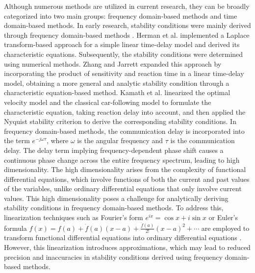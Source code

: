 \documentclass[journal]{IEEEtran}
\begin{document}
Although numerous methods are utilized in current research, they can be broadly categorized into two main groups: frequency domain-based methods and time domain-based methods. In early research, stability conditions were mainly derived through frequency domain-based methods \citep{qin2019experimental,zhang2017hierarchical}. Herman et al. \citep{herman1959traffic} implemented a Laplace transform-based approach for a simple linear time-delay model and derived its characteristic equations. Subsequently, the stability conditions were determined using numerical methods. Zhang and Jarrett \citep{zhang1997stability} expanded this approach by incorporating the product of sensitivity and reaction time in a linear time-delay model, obtaining a more general and analytic stability condition through a characteristic equation-based method. Kamath et al. \citep{kamath2015car} linearized the optimal velocity model and the classical car-following model to formulate the characteristic equation, taking reaction delay into account, and then applied the Nyquist stability criterion to derive the corresponding stability conditions. In frequency domain-based methods, the communication delay is incorporated into the term $e^{-j\omega\tau}$, where $\omega$ is the angular frequency and $\tau$ is the communication delay. The delay term implying frequency-dependent phase shift causes a continuous phase change across the entire frequency spectrum, leading to high dimensionality. The high dimensionality arises from the complexity of functional differential equations, which involve functions of both the current and past values of the variables, unlike ordinary differential equations that only involve current values. This high dimensionality poses a challenge for analytically deriving stability conditions in frequency domain-based methods. To address this, linearization techniques such as Fourier's form $e^{ix} =\cos{x}+ i \sin{x}$ or Euler's formula $f(x)=f(a)+\dot f(a)(x-a)+\frac{\ddot f(a)}{2!}(x-a)^2+\cdots$ are employed to transform functional differential equations into ordinary differential equations \citep{lhachemi2020feedback}. However, this linearization introduces approximations, which may lead to reduced precision and inaccuracies in stability conditions derived using frequency domain-based methods.
\end{document}
